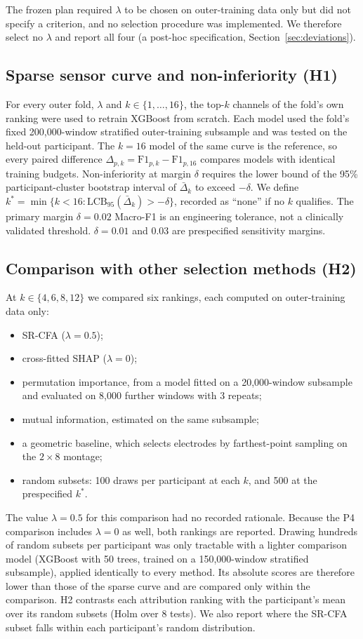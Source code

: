 The frozen plan required $\lambda$ to be chosen on outer-training data only but did not specify a criterion, and no selection procedure was implemented. We therefore select no $\lambda$ and report all four (a post-hoc specification, Section~\ref{sec:deviations}).

\subsection{Sparse sensor curve and non-inferiority (H1)}
For every outer fold, $\lambda$ and $k \in \{1,\ldots,16\}$, the top-$k$ channels of the fold's own ranking were used to retrain XGBoost from scratch. Each model used the fold's fixed 200,000-window stratified outer-training subsample and was tested on the held-out participant. The $k = 16$ model of the same curve is the reference, so every paired difference $\Delta_{p,k} = \mathrm{F1}_{p,k} - \mathrm{F1}_{p,16}$ compares models with identical training budgets. Non-inferiority at margin $\delta$ requires the lower bound of the 95\% participant-cluster bootstrap interval of $\bar\Delta_k$ to exceed $-\delta$. We define $k^* = \min\{k < 16 : \mathrm{LCB}_{95}(\bar\Delta_k) > -\delta\}$, recorded as ``none'' if no $k$ qualifies. The primary margin $\delta = 0.02$ Macro-F1 is an engineering tolerance, not a clinically validated threshold. $\delta = 0.01$ and $0.03$ are prespecified sensitivity margins.

\subsection{Comparison with other selection methods (H2)}
At $k \in \{4, 6, 8, 12\}$ we compared six rankings, each computed on outer-training data only:
\begin{itemize}
\item SR-CFA ($\lambda = 0.5$);
\item cross-fitted SHAP ($\lambda = 0$);
\item permutation importance, from a model fitted on a 20,000-window subsample and evaluated on 8,000 further windows with 3 repeats;
\item mutual information, estimated on the same subsample;
\item a geometric baseline, which selects electrodes by farthest-point sampling on the $2 \times 8$ montage;
\item random subsets: 100 draws per participant at each $k$, and 500 at the prespecified $k^*$.
\end{itemize}
The value $\lambda = 0.5$ for this comparison had no recorded rationale. Because the P4 comparison includes $\lambda = 0$ as well, both rankings are reported. Drawing hundreds of random subsets per participant was only tractable with a lighter comparison model (XGBoost with 50 trees, trained on a 150,000-window stratified subsample), applied identically to every method. Its absolute scores are therefore lower than those of the sparse curve and are compared only within the comparison. H2 contrasts each attribution ranking with the participant's mean over its random subsets (Holm over 8 tests). We also report where the SR-CFA subset falls within each participant's random distribution.

